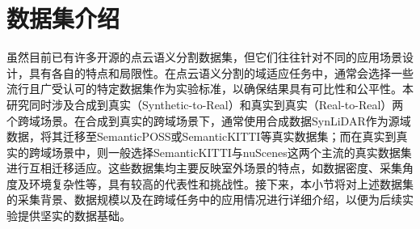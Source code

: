 \section{数据集介绍}
虽然目前已有许多开源的点云语义分割数据集，但它们往往针对不同的应用场景设计，具有各自的特点和局限性。在点云语义分割的域适应任务中，通常会选择一些流行且广受认可的特定数据集作为实验标准，以确保结果具有可比性和公平性。本研究同时涉及合成到真实（Synthetic-to-Real）和真实到真实（Real-to-Real）两个跨域场景。在合成到真实的跨域场景下，通常使用合成数据SynLiDAR作为源域数据，将其迁移至SemanticPOSS或SemanticKITTI等真实数据集；而在真实到真实的跨域场景中，则一般选择SemanticKITTI与nuScenes这两个主流的真实数据集进行互相迁移适应。这些数据集均主要反映室外场景的特点，如数据密度、采集角度及环境复杂性等，具有较高的代表性和挑战性。接下来，本小节将对上述数据集的采集背景、数据规模以及在跨域任务中的应用情况进行详细介绍，以便为后续实验提供坚实的数据基础。
